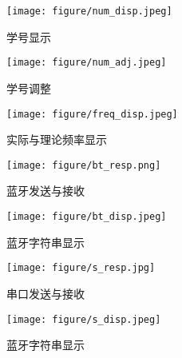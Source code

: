{\begin{spacing}{1.5}
	\begin{figure}[htbp]
		\centering
		\begin{minipage}{0.49\linewidth}
			\centering
			\texttt{[image: figure/num\_disp.jpeg]}
			\caption{学号显示}
			\label{numdisp}
		\end{minipage}
		\begin{minipage}{0.49\linewidth}
			\centering
			\texttt{[image: figure/num\_adj.jpeg]}
			\caption{学号调整}
			\label{numadj}
		\end{minipage}
	\end{figure}

	\begin{figure}[htbp]
		\centering
		\texttt{[image: figure/freq\_disp.jpeg]}
		\caption{实际与理论频率显示}\label{fig:freq_disp}
	\end{figure}

	\begin{figure}[htbp]
		\centering
		\begin{minipage}{0.25\linewidth}
			\centering
			\texttt{[image: figure/bt\_resp.png]}
			\caption{蓝牙发送与接收}
			\label{btresp}
		\end{minipage}
		\begin{minipage}{0.73\linewidth}
			\centering
			\texttt{[image: figure/bt\_disp.jpeg]}
			\caption{蓝牙字符串显示}
			\label{btdisp}
		\end{minipage}
	\end{figure}
	\newpage
	\begin{figure}[h!]
		\centering
		\begin{minipage}{0.49\linewidth}
			\centering
			\texttt{[image: figure/s\_resp.jpg]}
			\caption{串口发送与接收}
			\label{sresp}
		\end{minipage}
		\begin{minipage}{0.49\linewidth}
			\centering
			\texttt{[image: figure/s\_disp.jpeg]}
			\caption{蓝牙字符串显示}
			\label{sdisp}
		\end{minipage}
	\end{figure}
\end{spacing}
}